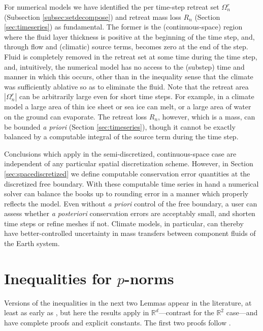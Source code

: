 \documentclass[final,onefignum]{siamart190516}
\newcommand\RR{\mathbb{R}}
\begin{document}
For numerical models we have identified the per time-step retreat set $\Omega_n^r$ (Subsection \ref{subsec:setdecompose}) and retreat mass loss $R_n$ (Section \ref{sec:timeseries}) as fundamental.  The former is the (continuous-space) region where the fluid layer thickness is positive at the beginning of the time step, and, through flow and (climatic) source terms, becomes zero at the end of the step.  Fluid is completely removed in the retreat set at some time during the time step, and, intuitively, the numerical model has no access to the (substep) time and manner in which this occurs, other than in the inequality sense that the climate was sufficiently ablative so as to eliminate the fluid.  Note that the retreat area $|\Omega_n^r|$ can be arbitrarily large even for short time steps.  For example, in a climate model a large area of thin ice sheet or sea ice can melt, or a large area of water on the ground can evaporate.  The retreat loss $R_n$, however, which is a mass, can be bounded \emph{a priori} (Section \ref{sec:timeseries}), though it cannot be exactly balanced by a computable integral of the source term during the time step.

Conclusions which apply in the semi-discretized, continuous-space case are independent of any particular spatial discretization scheme.  However, in Section \ref{sec:spacediscretized} we define computable conservation error quantities at the discretized free boundary.  With these computable time series in hand a numerical solver can balance the books up to rounding error in a manner which properly reflects the model.  Even without \emph{a priori} control of the free boundary, a user can assess whether \emph{a posteriori} conservation errors are acceptably small, and shorten time steps or refine meshes if not.  Climate models, in particular, can thereby have better-controlled uncertainty in mass transfers between component fluids of the Earth system.






\appendix

\section{Inequalities for $p$-norms}   \label{app:pinequalities}  Versions of the inequalities in the next two Lemmas appear in the literature, at least as early as \cite{GlowinskiMarroco1975}, but here the results apply in $\RR^d$---contrast \cite{BarrettLiu1993,GlowinskiMarroco1975} for the $\RR^2$ case---and have complete proofs and explicit constants.  The first two proofs follow \cite[Appendix A]{Peral1997}.
\end{document}
